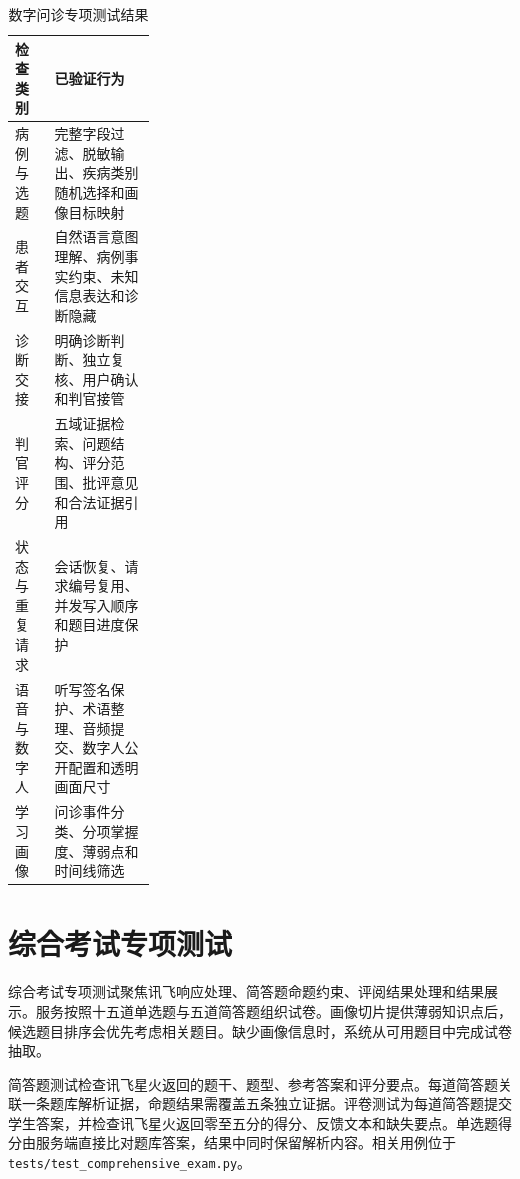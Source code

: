 \begin{table}[H]
  \centering
  \caption{数字问诊专项测试结果}
  \label{tab:clinical-speaking-test}
  \begin{tabularx}{\linewidth}{p{0.28\linewidth}X}
    \toprule
    检查类别 & 已验证行为 \\
    \midrule
    病例与选题 & 完整字段过滤、脱敏输出、疾病类别随机选择和画像目标映射 \\
    患者交互 & 自然语言意图理解、病例事实约束、未知信息表达和诊断隐藏 \\
    诊断交接 & 明确诊断判断、独立复核、用户确认和判官接管 \\
    判官评分 & 五域证据检索、问题结构、评分范围、批评意见和合法证据引用 \\
    状态与重复请求 & 会话恢复、请求编号复用、并发写入顺序和题目进度保护 \\
    语音与数字人 & 听写签名保护、术语整理、音频提交、数字人公开配置和透明画面尺寸 \\
    学习画像 & 问诊事件分类、分项掌握度、薄弱点和时间线筛选 \\
    \bottomrule
  \end{tabularx}
\end{table}

\section{综合考试专项测试}

综合考试专项测试聚焦讯飞响应处理、简答题命题约束、评阅结果处理和结果展示。服务按照十五道单选题与五道简答题组织试卷。画像切片提供薄弱知识点后，候选题目排序会优先考虑相关题目。缺少画像信息时，系统从可用题目中完成试卷抽取。

简答题测试检查讯飞星火返回的题干、题型、参考答案和评分要点。每道简答题关联一条题库解析证据，命题结果需覆盖五条独立证据。评卷测试为每道简答题提交学生答案，并检查讯飞星火返回零至五分的得分、反馈文本和缺失要点。单选题得分由服务端直接比对题库答案，结果中同时保留解析内容。相关用例位于 \texttt{tests/test\_comprehensive\_exam.py}。

